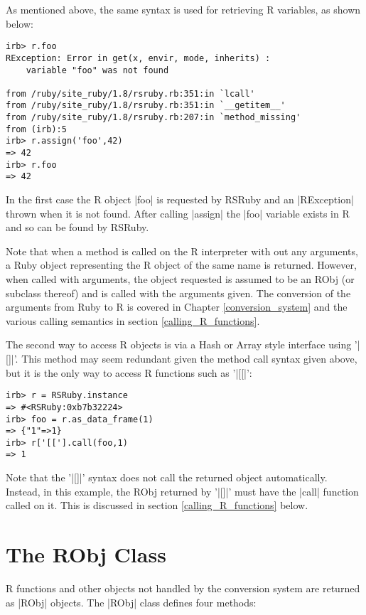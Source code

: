 \documentclass[a4paper,12pt]{book}
\begin{document}
As mentioned above, the same syntax is used for retrieving R variables, as shown below:

\begin{Verbatim}
irb> r.foo
RException: Error in get(x, envir, mode, inherits) : 
	variable "foo" was not found

from /ruby/site_ruby/1.8/rsruby.rb:351:in `lcall'
from /ruby/site_ruby/1.8/rsruby.rb:351:in `__getitem__'
from /ruby/site_ruby/1.8/rsruby.rb:207:in `method_missing'
from (irb):5
irb> r.assign('foo',42)
=> 42
irb> r.foo
=> 42
\end{Verbatim}

In the first case the R object |foo| is requested by RSRuby and an |RException| thrown when it is not found. After calling |assign| the |foo| variable exists in R and so can be found by RSRuby. 

Note that when a method is called on the R interpreter with out any arguments, a Ruby object representing the R object of the same name is returned. However, when called with arguments, the object requested is assumed to be an RObj (or subclass thereof) and is called with the arguments given. The conversion of the arguments from Ruby to R is covered in Chapter \ref{conversion_system} and the various calling semantics in section \ref{calling_R_functions}.

The second way to access R objects is via a Hash or Array style interface using '|[]|'. This method may seem redundant given the method call syntax given above, but it is the only way to access R functions such as '|[[|':

\begin{Verbatim}
irb> r = RSRuby.instance
=> #<RSRuby:0xb7b32224>
irb> foo = r.as_data_frame(1)
=> {"1"=>1}
irb> r['[['].call(foo,1)
=> 1
\end{Verbatim}

Note that the '|[]|' syntax does not call the returned object automatically. Instead, in this example, the RObj returned by '|[]|' must have the |call| function called on it. This is discussed in section \ref{calling_R_functions} below.

\section{The RObj Class}\label{the_robj_class}

R functions and other objects not handled by the conversion system are returned as |RObj| objects. The |RObj| class defines four methods:
\end{document}

